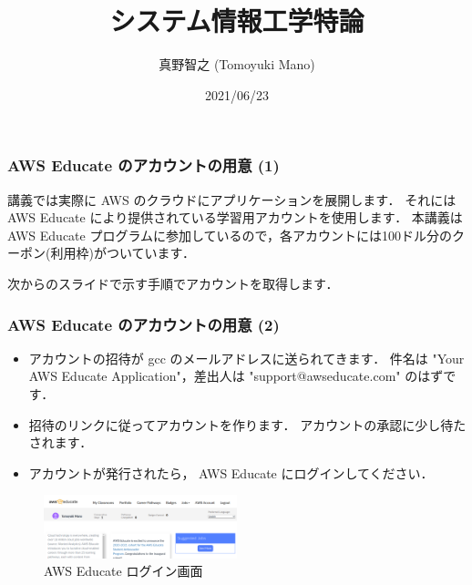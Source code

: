 \documentclass[unicode,11pt]{beamer}
\title{システム情報工学特論}
\author{真野智之 (Tomoyuki Mano)}
\institute[OIST]{Okinawa Institute of Science and Technology}
\date{2021/06/23}
\begin{document}
\frame{\titlepage}

\begin{frame}
\frametitle{AWS Educate のアカウントの用意 (1)}

講義では実際に AWS のクラウドにアプリケーションを展開します．
それには AWS Educate により提供されている学習用アカウントを使用します．
本講義は AWS Educate プログラムに参加しているので，各アカウントには100ドル分のクーポン(利用枠)がついています．

次からのスライドで示す手順でアカウントを取得します．

\end{frame}

\begin{frame}
\frametitle{AWS Educate のアカウントの用意 (2)}
\begin{itemize}
    \item アカウントの招待が gcc のメールアドレスに送られてきます．
    件名は "Your AWS Educate Application"，差出人は "support@awseducate.com" のはずです．
    \item 招待のリンクに従ってアカウントを作ります．
    アカウントの承認に少し待たされます．
    \item アカウントが発行されたら， AWS Educate にログインしてください．
\end{itemize}

\begin{figure}
    \centering
    \includegraphics[width=0.5\textwidth]{imgs/aws_educate_screenshot1.png}
    \caption{AWS Educate ログイン画面}
\end{figure}

\end{frame}
\end{document}
